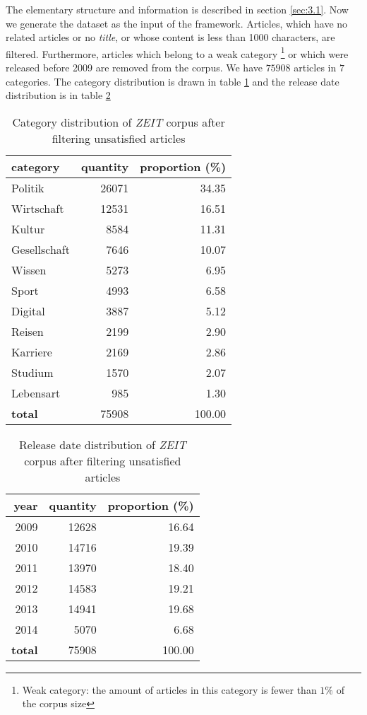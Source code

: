 The elementary structure and information is described in section \ref{sec:3.1}. Now we generate the dataset as the input of the framework. Articles, which have no related articles or no \textit{title}, or whose content is less than 1000 characters, are filtered. Furthermore, articles which belong to a weak category \footnote{Weak category: the amount of articles in this category is fewer than $1\%$ of the corpus size} or which were released before 2009 are removed from the corpus. We have $75908$ articles in $7$ categories. The category distribution is drawn in table \ref{tab:cate_dist_new} and the release date distribution is in table \ref{tab:release_dist_new}

\begin{table}[!htb]
\centering
\begin{tabular}{lrr}
\hline
\textbf{category} &   \textbf{quantity} &   \textbf{proportion (\%)} \\
\hline
Politik      &      26071 &            34.35 \\
Wirtschaft   &      12531 &            16.51 \\
Kultur       &       8584 &            11.31 \\
Gesellschaft &       7646 &            10.07 \\
Wissen       &       5273 &             6.95 \\
Sport        &       4993 &             6.58 \\
Digital      &       3887 &             5.12 \\
Reisen       &       2199 &             2.90 \\
Karriere     &       2169 &             2.86 \\
Studium      &       1570 &             2.07 \\
Lebensart    &        985 &             1.30 \\
\hline
\textbf{total}        &      75908 &           100.00 \\
\hline
\end{tabular}
\caption{Category distribution of \textit{ZEIT} corpus after filtering unsatisfied articles}
\label{tab:cate_dist_new}
\end{table}
\begin{table}[!htb]
\centering
\begin{tabular}{rrr}
\hline
\textbf{year} &   \textbf{quantity} &   \textbf{proportion (\%)} \\
\hline
2009 & 12628 &            16.64 \\
2010 & 14716 &            19.39 \\
2011 & 13970 &            18.40 \\
2012 & 14583 &            19.21 \\
2013 & 14941 &            19.68 \\
2014 &  5070 &             6.68 \\
\hline
\textbf{total} & 75908 &           100.00 \\
\hline
\end{tabular}
\caption{Release date distribution of \textit{ZEIT} corpus after filtering unsatisfied articles}
\label{tab:release_dist_new}
\end{table}

